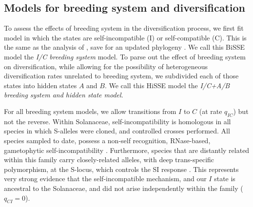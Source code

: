 \subsection{Models for breeding system and diversification}

To assess the effects of breeding system in the diversification process, we first fit model in which the states are self-incompatible (I) or self-compatible (C).
This is the same as the analysis of \citet{goldberg_2010}, save for an updated phylogeny \citep{sarkinen_2013}.
We call this BiSSE model the \textit{I/C breeding system} model. 
To parse out the effect of breeding system on diversification, while allowing for the possibility of heterogeneous diversification rates unrelated to breeding system, we subdivided each of those states into hidden states $A$ and $B$.
We call this HiSSE model the \textit{I/C+A/B breeding system and hidden state model}. 

For all breeding system models, we allow transitions from $I$ to $C$ (at rate $q_{IC}$) but not the reverse.
Within Solanaceae, self-incompatibility is homologous in all species in which S-alleles were cloned, and controlled crosses performed.  
All species sampled to date, possess a non-self recognition, RNase-based, gametophytic self-incompatibility \citep[shared even with other euasterid families;][]{ramanauskas_2017}.
Furthermore, species that are distantly related within this family carry closely-related alleles, with deep trans-specific polymorphism, at the S-locus, which controls the SI response \citep{ioerger_1990, igic_2006}. %
This represents very strong evidence that the self-incompatible mechanism, and our $I$ state is ancestral to the Solanaceae, and did not arise independently within the family ($q_{CI}=0$). %
%

